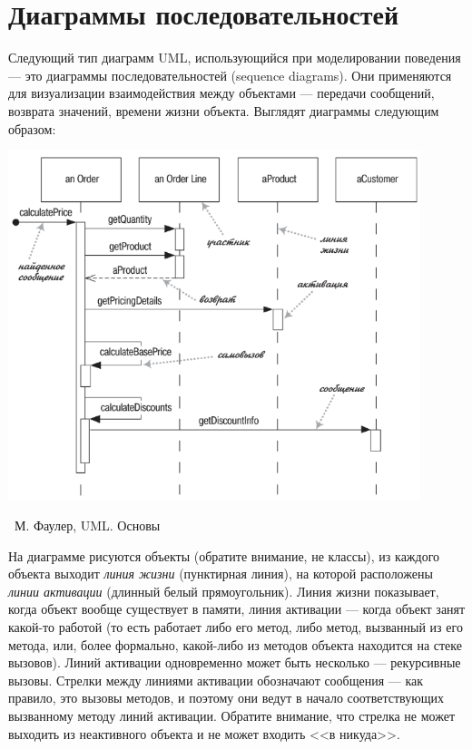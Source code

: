 \documentclass[a5paper]{article}
\newcommand{\attribution}[1] {
	\vspace{-5mm}\begin{flushright}\begin{scriptsize}%
	{\textcopyright\, #1}\end{scriptsize}\end{flushright}
}
\begin{document}
\section{Диаграммы последовательностей}

Следующий тип диаграмм UML, использующийся при моделировании поведения --- это диаграммы последовательностей (sequence diagrams). Они применяются для визуализации взаимодействия между объектами --- передачи сообщений, возврата значений, времени жизни объекта. Выглядят диаграммы следующим образом:

\begin{center}
	\includegraphics[width=0.9\textwidth]{sequenceDiagramSyntax.png}
	\attribution{М. Фаулер, UML. Основы}
\end{center}

На диаграмме рисуются объекты (обратите внимание, не классы), из каждого объекта выходит \textit{линия жизни} (пунктирная линия), на которой расположены \textit{линии активации} (длинный белый прямоугольник). Линия жизни показывает, когда объект вообще существует в памяти, линия активации --- когда объект занят какой-то работой (то есть работает либо его метод, либо метод, вызванный из его метода, или, более формально, какой-либо из методов объекта находится на стеке вызовов). Линий активации одновременно может быть несколько --- рекурсивные вызовы. Стрелки между линиями активации обозначают сообщения --- как правило, это вызовы методов, и поэтому они ведут в начало соответствующих вызванному методу линий активации. Обратите внимание, что стрелка не может выходить из неактивного объекта и не может входить <<в никуда>>.
\end{document}
